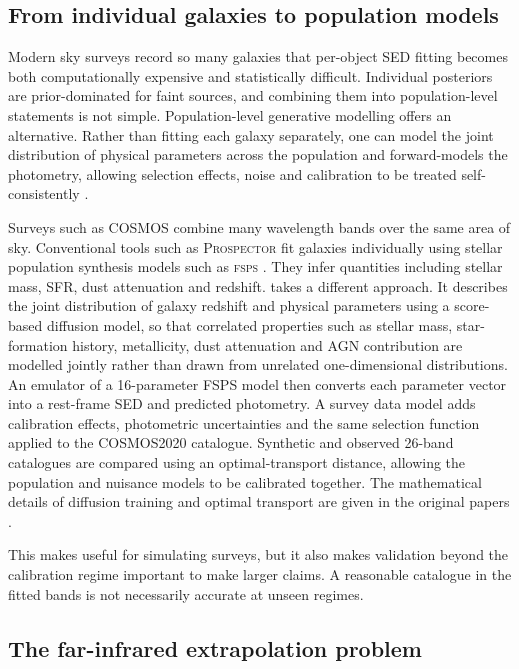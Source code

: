 \documentclass[12pt,a4paper]{article}
\begin{document}
\subsection{From individual galaxies to population models}
\label{sec:intro:population}

Modern sky surveys record so many galaxies that per-object SED fitting becomes both
computationally expensive and statistically difficult. Individual posteriors are
prior-dominated for faint sources, and combining them into population-level statements
is not simple. Population-level generative modelling offers an alternative. Rather than
fitting each galaxy separately, one can model the joint distribution of physical parameters
across the population and forward-models the photometry, allowing selection effects,
noise and calibration to be treated self-consistently \citep{Alsing_2024}.

Surveys such as COSMOS \citep{Scoville_2007} combine many wavelength bands over the
same area of sky. Conventional tools such as \textsc{Prospector} \citep{Leja_2017}
fit galaxies individually using stellar population synthesis models such as
\textsc{fsps} \citep{Conroy_2009}. They infer quantities including stellar mass, SFR,
dust attenuation and redshift. \popcosmos{} \citep{Alsing_2024,Thorp_2024} takes a
different approach. It
describes the joint distribution of galaxy redshift and physical parameters using a
score-based diffusion model, so that correlated properties such as stellar mass,
star-formation history, metallicity, dust attenuation and AGN contribution are modelled
jointly rather than drawn from unrelated one-dimensional distributions. An emulator of
a 16-parameter FSPS model then converts each parameter vector into a
rest-frame SED and predicted photometry. A survey data model adds calibration effects,
photometric uncertainties and the same selection function applied to the COSMOS2020
catalogue. Synthetic and observed 26-band catalogues are compared using an
optimal-transport distance, allowing the population and nuisance models to be
calibrated together. The mathematical details of diffusion training and optimal
transport are given in the original papers \citep{Alsing_2024,Thorp_2024}.

This makes \popcosmos{} useful for simulating surveys, but it also makes validation beyond the calibration regime important to make larger claims. A reasonable
catalogue in the fitted bands is not necessarily accurate at unseen regimes.

\subsection{The far-infrared extrapolation problem}
\label{sec:intro:extrapolation}
\end{document}
